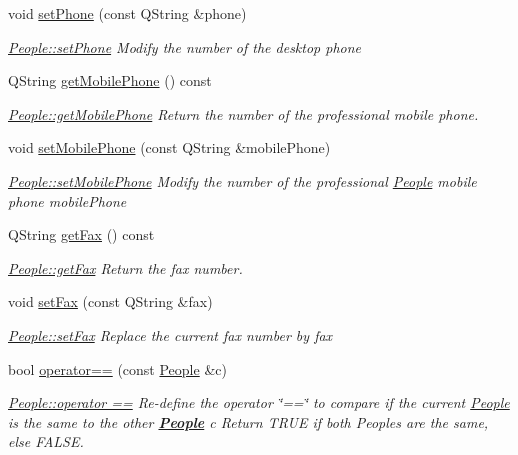 \begin{DoxyCompactItemize}
void \hyperlink{classModels_1_1People_adea0f24c3438d7c65a6df522e3253863}{set\-Phone} (const Q\-String \&phone)
\begin{DoxyCompactList}\small\item\em \hyperlink{classModels_1_1People_adea0f24c3438d7c65a6df522e3253863}{People\-::set\-Phone} Modify the number of the desktop {\itshape phone} \end{DoxyCompactList}\item 
Q\-String \hyperlink{classModels_1_1People_aaf8d6ac89ea0ae0a1064503f3b9b6dbb}{get\-Mobile\-Phone} () const 
\begin{DoxyCompactList}\small\item\em \hyperlink{classModels_1_1People_aaf8d6ac89ea0ae0a1064503f3b9b6dbb}{People\-::get\-Mobile\-Phone} Return the number of the professional mobile phone. \end{DoxyCompactList}\item 
void \hyperlink{classModels_1_1People_a38e71d8991c2ef70f4f3f4b864913a58}{set\-Mobile\-Phone} (const Q\-String \&mobile\-Phone)
\begin{DoxyCompactList}\small\item\em \hyperlink{classModels_1_1People_a38e71d8991c2ef70f4f3f4b864913a58}{People\-::set\-Mobile\-Phone} Modify the number of the professional \hyperlink{classModels_1_1People}{People} mobile phone {\itshape mobile\-Phone} \end{DoxyCompactList}\item 
Q\-String \hyperlink{classModels_1_1People_a30b8378d221c9f20a66797a526973be9}{get\-Fax} () const 
\begin{DoxyCompactList}\small\item\em \hyperlink{classModels_1_1People_a30b8378d221c9f20a66797a526973be9}{People\-::get\-Fax} Return the fax number. \end{DoxyCompactList}\item 
void \hyperlink{classModels_1_1People_adaa1a83318fd0a251cbcc4a93dc01096}{set\-Fax} (const Q\-String \&fax)
\begin{DoxyCompactList}\small\item\em \hyperlink{classModels_1_1People_adaa1a83318fd0a251cbcc4a93dc01096}{People\-::set\-Fax} Replace the current fax number by {\itshape fax} \end{DoxyCompactList}\item 
bool \hyperlink{classModels_1_1People_a1c875989cffc3119ff1f263c7898bbdb}{operator==} (const \hyperlink{classModels_1_1People}{People} \&c)
\begin{DoxyCompactList}\small\item\em \hyperlink{classModels_1_1People_a1c875989cffc3119ff1f263c7898bbdb}{People\-::operator ==} Re-\/define the operator \char`\"{}==\char`\"{} to compare if the current \hyperlink{classModels_1_1People}{People} is the same to the other {\bfseries \hyperlink{classModels_1_1People}{People}} {\itshape c} Return T\-R\-U\-E if both Peoples are the same, else F\-A\-L\-S\-E. \end{DoxyCompactList}\item 

\end{DoxyCompactItemize}
